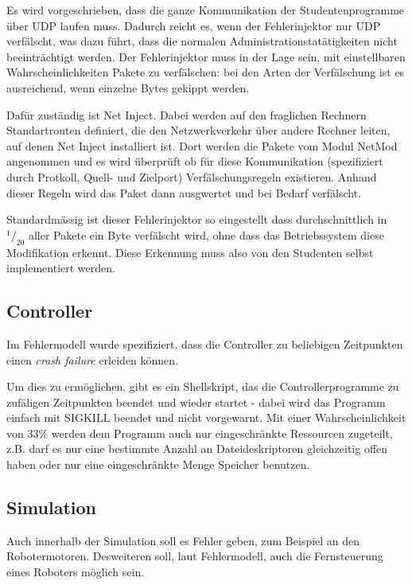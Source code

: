 Es wird vorgeschrieben, dass die ganze Kommunikation der Studentenprogramme {\"{u}}ber UDP laufen muss. Dadurch reicht es, wenn der Fehlerinjektor nur UDP verf{\"{a}}lscht, was dazu
f{\"{u}}hrt, dass die normalen Administrationstat{\"{a}}tigkeiten nicht beeintr{\"{a}}chtigt werden. Der Fehlerinjektor muss in der Lage sein, mit einstellbaren Wahrscheinlichkeiten
Pakete zu verf{\"{a}}lschen: bei den Arten der Verf{\"{a}}lschung ist es ausreichend, wenn einzelne Bytes gekippt werden.

Daf{\"{u}}r zust{\"{a}}ndig ist Net Inject\cite{kubertzki}. Dabei werden auf den fraglichen Rechnern
Standartrouten definiert, die den Netzwerkverkehr {\"{u}}ber andere Rechner leiten, auf denen Net Inject
installiert ist. Dort werden die Pakete vom Modul NetMod angenommen und es wird {\"{u}}berpr{\"{u}}ft ob
f{\"{u}}r diese Kommunikation (spezifiziert durch Protkoll, Quell- und Zielport) Verf{\"{a}}lschungsregeln
existieren. Anhand dieser Regeln wird das Paket dann ausgwertet und bei Bedarf verf{\"{a}}lscht.

Standardm{\"{a}}ssig ist dieser Fehlerinjektor so eingestellt dass durchschnittlich in $ ^1/_{20} $ aller Pakete ein Byte verf{\"{a}}lscht wird,
ohne dass das Betriebssystem diese Modifikation erkennt. Diese Erkennung muss also von den Studenten selbst implementiert werden.

\subsection{Controller}
Im Fehlermodell wurde spezifiziert, dass die Controller zu beliebigen Zeitpunkten einen
\textit{crash failure} erleiden k{\"{o}}nnen.

Um dies zu erm{\"{o}}glichen, gibt es ein Shellskript, das die Controllerprogramme zu zuf{\"{a}}ligen Zeitpunkten 
beendet und wieder startet - dabei wird das Programm einfach mit SIGKILL beendet und nicht vorgewarnt.
Mit einer Wahrscheinlichkeit von 33\% werden dem Programm auch nur eingeschr{\"{a}}nkte Ressourcen zugeteilt,
z.B. darf es nur eine bestimmte Anzahl an Dateideskriptoren gleichzeitig offen haben oder nur eine 
eingeschr{\"{a}}nkte Menge Speicher benutzen.


\subsection{Simulation}
Auch innerhalb der Simulation soll es Fehler geben, zum Beispiel an den Robotermotoren. Desweiteren soll,
laut Fehlermodell, auch die Fernsteuerung eines Roboters m{\"{o}}glich sein.

